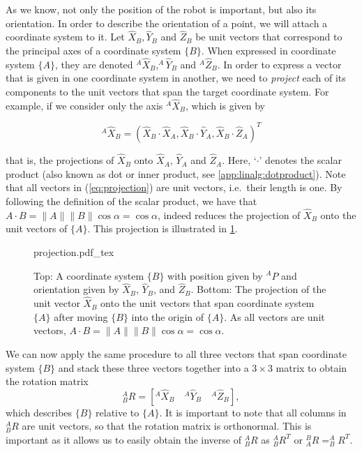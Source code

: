 As we know, not only the position of the robot is important, but also its orientation.
In order to describe the orientation of a point, we will attach a coordinate system to it. Let $ \hat{X}_B, \hat{Y}_B$ and $ \hat{Z}_B$ be unit vectors that correspond to the principal axes of a coordinate system $\{B\}$.
When expressed in coordinate system $\{A\}$, they are denoted $^A\hat{X}_B, ^A\hat{Y}_B$ and $ ^A\hat{Z}_B$.
In order to express a vector that is given in one coordinate system in another, we need to \textsl{project} each of its components to the unit vectors that span the target coordinate system. For example, if we consider only the axis $^A\hat{X}_B$, which is given by

\begin{equation}\label{eq:projection}
^A\hat{X}_B=(\hat{X}_B\cdot\hat{X}_A, \hat{X}_B\cdot\hat{Y}_A,\hat{X}_B\cdot\hat{Z}_A)^T
\end{equation}

that is, the projections of $\hat{X}_B$ onto $\hat{X}_A$, $\hat{Y}_A$ and $\hat{Z}_A$. Here, `$\cdot$' denotes the scalar product (also known as dot or inner product, see \cref{app:linalg:dotproduct}).
Note that all vectors in (\ref{eq:projection}) are unit vectors, i.e.\ their length is one.
By following the definition of the scalar product, we have that $A\cdot B=\|A\|\|B\|\cos \alpha=\cos \alpha$, indeed reduces the projection of $\hat{X}_B$ onto the unit vectors of $\{A\}$. This projection is illustrated in \cref{fig:projection}.

\begin{figure}
    \centering
    \def\svgwidth{0.65\textwidth}
    {projection.pdf_tex}
    \caption{Top: A coordinate system $\{B\}$ with position given by $^AP$ and orientation given by $\hat{X}_B$, $\hat{Y}_B$, and $\hat{Z}_B$. Bottom:
    The projection of the unit vector $\hat{X}_B$ onto the unit vectors that span coordinate system $\{A\}$ after moving $\{B\}$ into the origin of $\{A\}$. As all vectors are unit vectors, $A\cdot B=\|A\|\|B\|\cos \alpha=\cos \alpha$. }
    \label{fig:projection}
\end{figure}

We can now apply the same procedure to all three vectors that span coordinate system $\{B\}$ and stack these three vectors together into a $3\times3$ matrix to obtain the rotation matrix
%
\begin{equation}
^A_BR=[^A\hat{X}_B \quad ^A\hat{Y}_B \quad ^A\hat{Z}_B]   ,
\end{equation}
%
which describes $\{B\}$ relative to $\{A\}$.
It is important to note that all columns in $ ^A_BR$ are unit vectors, so that the rotation matrix is orthonormal.
This is important as it allows us to easily obtain the inverse of $ ^A_BR$ as $ ^A_BR^T$ or
$ ^B_AR=^A_BR^T$.

